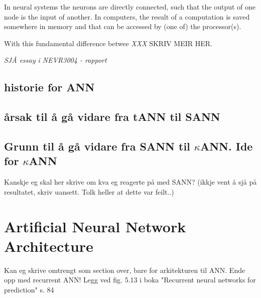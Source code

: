 In neural systems the neurons are directly connected, such that the output of one node is the input of another. In computers, the result of a computation is saved somewhere in memory and that can be accessed by (one of) the processor(s).

With this fundamental difference betwee  \emph{XXX} SKRIV MEIR HER.


\newpage
		\emph{SJÅ essay i NEVR3004 - rapport}

	\subsection{historie for ANN}


	\subsection{årsak til å gå vidare fra tANN til SANN}
	\subsection{Grunn til å gå vidare fra SANN til $\kappa$ANN. Ide for $\kappa$ANN}
		Kanskje eg skal her skrive om kva eg  reagerte på med SANN? (ikkje vent å sjå på resultatet, skriv uansett. Tolk heller at dette var feilt..)

\section{Artificial Neural Network Architecture}
Kan eg skrive omtrengt som section over, bare for arkitekturen til ANN. Ende opp med recurrent ANN!
Legg ved fig. 5.13 i boka "Recurrent neural networks for prediction" s. 84






